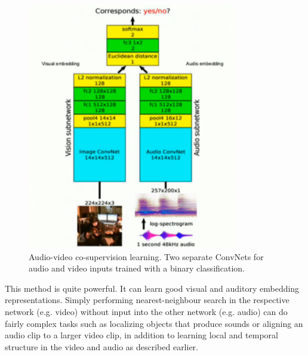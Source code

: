 \begin{figure}[H]
  \includegraphics[width=\linewidth]{figs/audio-video.png}
    \caption{Audio-video co-supervision learning. 
    Two separate ConvNets for audio and video inputs trained with a binary classification.}
  \label{fig:audio-video}
\end{figure}

This method is quite powerful. 
It can learn good visual and auditory embedding representations. 
Simply performing nearest-neighbour search in the respective network (e.g. video) without input into the other network (e.g. audio) can do fairly complex tasks such as localizing objects that produce sounds or aligning an audio clip to a larger video clip, in addition to learning local and temporal structure in the video and audio as described earlier.

